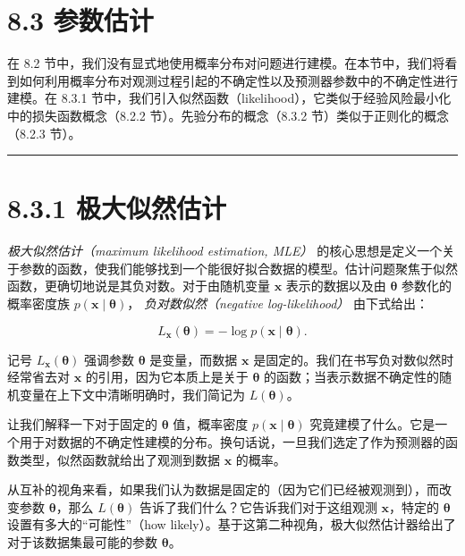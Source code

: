 \section*{8.3 参数估计}
\label{sec:8.3}

在 8.2 节中，我们没有显式地使用概率分布对问题进行建模。在本节中，我们将看到如何利用概率分布对观测过程引起的不确定性以及预测器参数中的不确定性进行建模。在 8.3.1 节中，我们引入似然函数（likelihood），它类似于经验风险最小化中的损失函数概念（8.2.2 节）。先验分布的概念（8.3.2 节）类似于正则化的概念（8.2.3 节）。

\medskip\hrule\medskip

\section*{8.3.1 极大似然估计}

\emph{极大似然估计（maximum likelihood estimation, MLE）} 的核心思想是定义一个关于参数的函数，使我们能够找到一个能很好拟合数据的模型。估计问题聚焦于似然函数，更确切地说是其负对数。对于由随机变量 $ \boldsymbol{x} $ 表示的数据以及由 $ \boldsymbol{\theta} $ 参数化的概率密度族 $ p(\boldsymbol{x} \mid \boldsymbol{\theta}) $， \emph{负对数似然（negative log-likelihood）} 由下式给出：

\begin{equation}
L_{\boldsymbol{x}}(\boldsymbol{\theta}) = -\log p(\boldsymbol{x} \mid \boldsymbol{\theta}) .
\tag{8.14}\label{eq:8-14}
\end{equation}

记号 $ L_{\boldsymbol{x}}(\boldsymbol{\theta}) $ 强调参数 $ \boldsymbol{\theta} $ 是变量，而数据 $ \boldsymbol{x} $ 是固定的。我们在书写负对数似然时经常省去对 $ \boldsymbol{x} $ 的引用，因为它本质上是关于 $ \boldsymbol{\theta} $ 的函数；当表示数据不确定性的随机变量在上下文中清晰明确时，我们简记为 $ L(\boldsymbol{\theta}) $。

让我们解释一下对于固定的 $ \boldsymbol{\theta} $ 值，概率密度 $ p(\boldsymbol{x} \mid \boldsymbol{\theta}) $ 究竟建模了什么。它是一个用于对数据的不确定性建模的分布。换句话说，一旦我们选定了作为预测器的函数类型，似然函数就给出了观测到数据 $ \boldsymbol{x} $ 的概率。

从互补的视角来看，如果我们认为数据是固定的（因为它们已经被观测到），而改变参数 $ \boldsymbol{\theta} $，那么 $ L(\boldsymbol{\theta}) $ 告诉了我们什么？它告诉我们对于这组观测 $ \boldsymbol{x} $，特定的 $ \boldsymbol{\theta} $ 设置有多大的“可能性”（how likely）。基于这第二种视角，极大似然估计器给出了对于该数据集最可能的参数 $ \boldsymbol{\theta} $。

